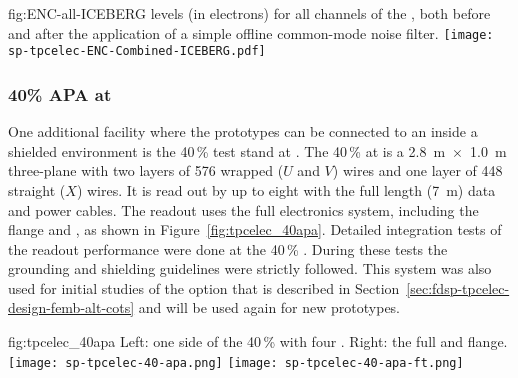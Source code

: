\begin{dunefigure}
{fig:ENC-all-ICEBERG}
{ levels (in electrons) for all channels of the  ,
both before and after the application of a simple offline common-mode noise filter.}
\texttt{[image: sp-tpcelec-ENC-Combined-ICEBERG.pdf]}
\end{dunefigure}


\subsubsection{40\% APA at }
\label{sec:fdsp-tpcelec-qa-facilities-fortypercent}

One additional facility where the  prototypes can be connected to
an  inside a shielded environment is the \num{40}\,\%  
test stand at . The \num{40}\,\%  at  is a \SI{2.8}{m}~$\times$~\SI{1.0}{m} 
three-plane  with two layers of \num{576} wrapped ($U$ and $V$) wires 
and one layer of \num{448} straight ($X$) wires. It is read out by up to eight 
 with the full length (\SI{7}{m})  data and  power 
cables. The readout uses the full  electronics 
system, including the  flange and , as shown in Figure~\ref{fig:tpcelec_40apa}. 
Detailed integration tests of the   readout performance were done 
at the \num{40}\,\% . During these tests the  grounding and shielding guidelines
were strictly followed.  This system was also used for initial studies of the  
option that is described in Section~\ref{sec:fdsp-tpcelec-design-femb-alt-cots} and will
be used again for new  prototypes.

\begin{dunefigure}
{fig:tpcelec_40apa}
{Left: one side of the \num{40}\,\%  with four .  Right: the full  \fdth and flange.}
\texttt{[image: sp-tpcelec-40-apa.png]}
\hspace{3mm}
\texttt{[image: sp-tpcelec-40-apa-ft.png]}
\end{dunefigure}

